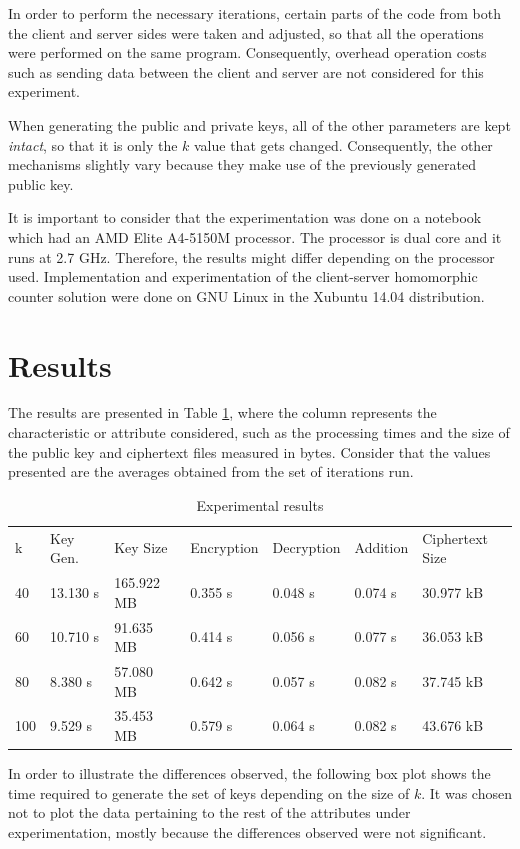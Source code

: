 In order to perform the necessary iterations, certain parts of the code from both the client and server sides were taken and adjusted, so that all the operations were performed on the same program. Consequently, overhead operation costs such as sending data between the client and server are not considered for this experiment.

When generating the public and private keys, all of the other parameters are kept \emph{intact}, so that it is only the $k$ value that gets changed. Consequently, the other mechanisms slightly vary because they make use of the previously generated public key.

It is important to consider that the experimentation was done on a notebook which had an AMD Elite A4-5150M processor. The processor is dual core and it runs at 2.7 GHz. Therefore, the results might differ depending on the processor used. Implementation and experimentation of the client-server homomorphic counter solution were done on GNU Linux in the Xubuntu 14.04 distribution.

\section{Results}

The results are presented in Table \ref{tbl:results}, where the column represents the characteristic or attribute considered, such as the processing times and the size of the public key and ciphertext files measured in bytes. Consider that the values presented are the averages obtained from the set of iterations run.

\begin{table}[t]
  \caption{Experimental results}
  \label{tbl:results}
\begin{tabular}{lllllll}
k   & Key Gen. & Key Size  & Encryption & Decryption & Addition & Ciphertext Size \\
40  & 13.130 s & 165.922 MB & 0.355 s    & 0.048 s    & 0.074 s  & 30.977 kB        \\
60  & 10.710 s & 91.635 MB  & 0.414 s    & 0.056 s    & 0.077 s  & 36.053 kB        \\
80  & 8.380 s  & 57.080 MB  & 0.642 s    & 0.057 s    & 0.082 s  & 37.745 kB        \\
100 & 9.529 s  & 35.453 MB  & 0.579 s    & 0.064 s    & 0.082 s  & 43.676 kB
\end{tabular}
\end{table}

In order to illustrate the differences observed, the following box plot shows the time required to generate the set of keys depending on the size of $k$. It was chosen not to plot the data pertaining to the rest of the attributes under experimentation, mostly because the differences observed were not significant.

